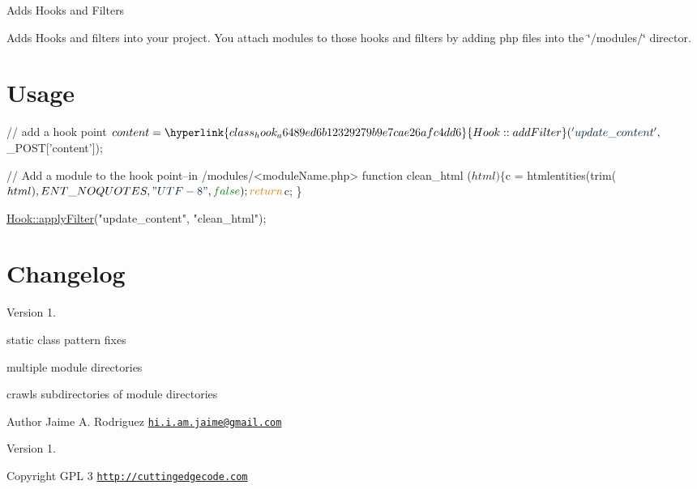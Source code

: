 Adds Hooks and Filters

Adds Hooks and filters into your project. You attach modules to those hooks and filters by adding php files into the \char`\"{}/modules/\char`\"{} director.\hypertarget{template1_usage}{}\section{Usage}\label{template1_usage}

\begin{DoxyCode}
\textcolor{comment}{// add a hook point}
$content = \hyperlink{class_hook_a6489ed6b12329279b9e7cae26afc4dd6}{Hook::addFilter}(\textcolor{stringliteral}{'update\_content'}, $\_POST[\textcolor{stringliteral}{'content'}]);

\textcolor{comment}{// Add a module to the hook point--in /modules/<moduleName.php>}
\textcolor{keyword}{function} clean\_html ($html) \{
    $c = htmlentities(trim($html), ENT\_NOQUOTES, \textcolor{stringliteral}{"UTF-8"}, \textcolor{keyword}{false});
    \textcolor{keywordflow}{return} $c;
\}

\hyperlink{class_hook_aae875eca0ec73f226ce615840f06d161}{Hook::applyFilter}(\textcolor{stringliteral}{"update\_content"}, \textcolor{stringliteral}{"clean\_html"});
\end{DoxyCode}
\hypertarget{template1_changelog}{}\section{Changelog}\label{template1_changelog}
Version 1.


\begin{DoxyItemize}
\item static class pattern fixes
\item multiple module directories
\item crawls subdirectories of module directories
\end{DoxyItemize}

\begin{DoxyAuthor}{Author}
Jaime A. Rodriguez \href{mailto:hi.i.am.jaime@gmail.com}{\tt hi.\-i.\-am.\-jaime@gmail.\-com} 
\end{DoxyAuthor}
\begin{DoxyVersion}{Version}
1. 
\end{DoxyVersion}
\begin{DoxyCopyright}{Copyright}
G\-P\-L 3 \href{http://cuttingedgecode.com}{\tt http\-://cuttingedgecode.\-com} 
\end{DoxyCopyright}
